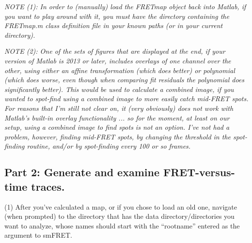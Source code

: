 \documentclass[11pt]{article}
\begin{document}
{\it NOTE (1): In order to (manually) load the FRETmap object back into Matlab, if you want to play around with it, you must have the directory containing the FRETmap.m class definition file in your known paths (or in your current directory).}

{\it NOTE (2): One of the sets of figures that are displayed at the end, if your version of Matlab is 2013 or later, includes overlays of one channel over the other, using either an affine transformation (which does better) or polynomial (which does worse, even though when comparing fit residuals the polynomial does significantly better).  This would be used to calculate a combined image, if you wanted to spot-find using a combined image to more easily catch mid-FRET spots.  For reasons that I'm still not clear on, it (very obviously) does not work with Matlab's built-in overlay functionality ... so for the moment, at least on our setup, using a combined image to find spots is not an option. I've not had a problem, however, finding mid-FRET spots, by changing the threshold in the spot-finding routine, and/or by spot-finding every 100 or so frames.}

\subsection{Part 2: Generate and examine FRET-versus-time traces.}

(1) After you've calculated a map, or if you chose to load an old one, navigate (when prompted) to the directory that has the data directory/directories you want to analyze, whose names should start with the ``rootname'' entered as the argument to smFRET.
\end{document}
